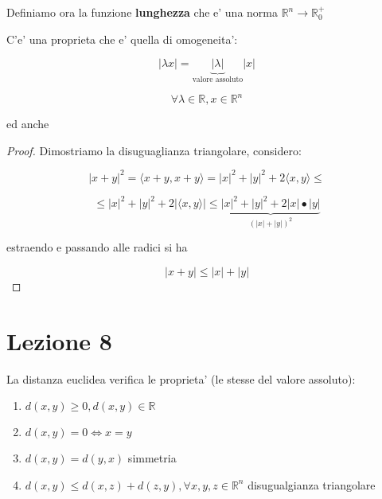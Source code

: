 \documentclass[11pt]{article}
\begin{document}
 Definiamo ora la funzione \textbf{lunghezza} che e' una norma $\mathbb{R}^{n}\rightarrow \mathbb{R}_0^{+}$

 C'e' una proprieta che e' quella di omogeneita':

 \[
     |\lambda x| = \underbrace{|\lambda|}_\text{valore assoluto} |x| 
 \]

 \[
 \forall \lambda \in \mathbb{R},x \in \mathbb{R}^{n}    
 \]

 ed anche 


 

\begin{proof}
       Dimostriamo la disuguaglianza triangolare, considero:

       \[
           |x+y|^{2} = \langle x+y , x+y \rangle = |x|^{2}+|y|^{2} + 2 \langle x,y \rangle \le 
       \]

       \[
           \le |x|^{2} + |y| ^{2} + 2|\langle x,y \rangle| \le \underbrace{|x| ^{2} + |y|^{2} + 2|x|\bullet |y|}_{(|x|+|y|)^{2}}
       \]

       estraendo e passando alle radici si ha

       \[
           |x+y| \le |x|+|y|
       \]
\end{proof}




\newpage

\section{Lezione 8}

La distanza euclidea verifica le proprieta' (le stesse del valore assoluto):

\begin{enumerate}
    \item  $d(x,y) \ge 0, d(x,y) \in \mathbb{R}$
    \item  $d(x,y) = 0 \Leftrightarrow x=y$
    \item  $d(x,y) = d(y,x)$ simmetria
    \item  $d(x,y) \le d(x,z) + d(z,y), \forall x,y,z \in \mathbb{R}^{n} $ disugualgianza triangolare
\end{enumerate}
\end{document}

